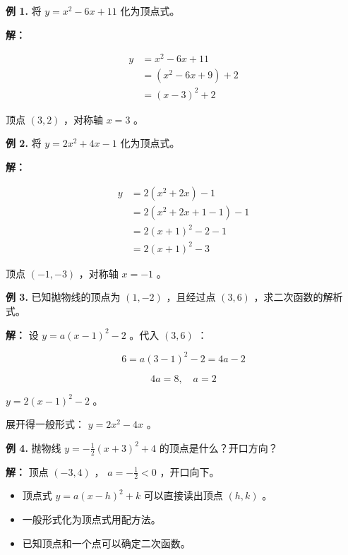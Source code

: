 \begin{workedexamples}


\textbf{例 1.} 将 $y = x^2 - 6x + 11$ 化为顶点式。

\textbf{解：}

\[
\begin{aligned}
y &= x^2 - 6x + 11 \\
&= (x^2 - 6x + 9) + 2 \\
&= (x - 3)^2 + 2
\end{aligned}
\]


顶点 $(3, 2)$ ，对称轴 $x = 3$ 。

\textbf{例 2.} 将 $y = 2x^2 + 4x - 1$ 化为顶点式。

\textbf{解：}

\[
\begin{aligned}
y &= 2(x^2 + 2x) - 1 \\
&= 2(x^2 + 2x + 1 - 1) - 1 \\
&= 2(x + 1)^2 - 2 - 1 \\
&= 2(x + 1)^2 - 3
\end{aligned}
\]


顶点 $(-1, -3)$ ，对称轴 $x = -1$ 。

\textbf{例 3.} 已知抛物线的顶点为 $(1, -2)$ ，且经过点 $(3, 6)$ ，求二次函数的解析式。

\textbf{解：} 设 $y = a(x - 1)^2 - 2$ 。代入 $(3, 6)$ ：

\[
6 = a(3 - 1)^2 - 2 = 4a - 2
\]


\[
4a = 8, \quad a = 2
\]


$y = 2(x - 1)^2 - 2$ 。

展开得一般形式： $y = 2x^2 - 4x$ 。

\textbf{例 4.} 抛物线 $y = -\frac{1}{2}(x + 3)^2 + 4$ 的顶点是什么？开口方向？

\textbf{解：} 顶点 $(-3, 4)$ ， $a = -\frac{1}{2} < 0$ ，开口向下。

\end{workedexamples}

\begin{keytakeaway}


\begin{itemize}
  \item 顶点式 $y = a(x-h)^2 + k$ 可以直接读出顶点 $(h, k)$ 。
  \item 一般形式化为顶点式用配方法。
  \item 已知顶点和一个点可以确定二次函数。
\end{itemize}


\end{keytakeaway}

